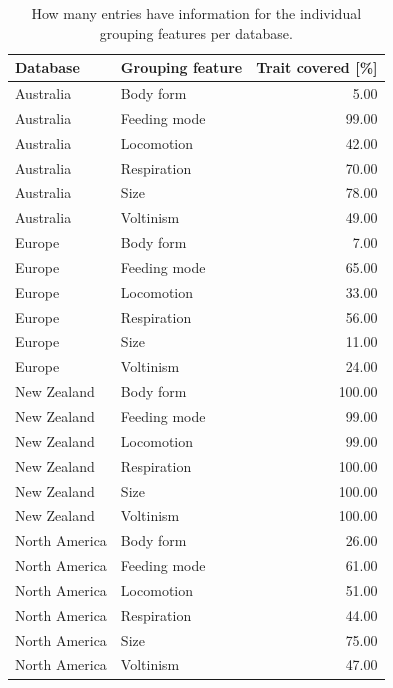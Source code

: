 \documentclass{article}
\begin{document}
\begin{table}[H]
  \centering
  \caption{How many entries have information for the 
  individual grouping features per database.} 
  \label{tab:trait_coverage}
  \begin{tabular}{llr}
    \hline
  Database & Grouping feature & Trait covered [\%] \\ 
    \hline
  Australia & Body form & 5.00 \\ 
    Australia & Feeding mode & 99.00 \\ 
    Australia & Locomotion & 42.00 \\ 
    Australia & Respiration & 70.00 \\ 
    Australia & Size & 78.00 \\ 
    Australia & Voltinism & 49.00 \\ 
    Europe & Body form & 7.00 \\ 
    Europe & Feeding mode & 65.00 \\ 
    Europe & Locomotion & 33.00 \\ 
    Europe & Respiration & 56.00 \\ 
    Europe & Size & 11.00 \\ 
    Europe & Voltinism & 24.00 \\ 
    New Zealand & Body form & 100.00 \\ 
    New Zealand & Feeding mode & 99.00 \\ 
    New Zealand & Locomotion & 99.00 \\ 
    New Zealand & Respiration & 100.00 \\ 
    New Zealand & Size & 100.00 \\ 
    New Zealand & Voltinism & 100.00 \\ 
    North America & Body form & 26.00 \\ 
    North America & Feeding mode & 61.00 \\ 
    North America & Locomotion & 51.00 \\ 
    North America & Respiration & 44.00 \\ 
    North America & Size & 75.00 \\ 
    North America & Voltinism & 47.00 \\ 
    \hline
  \end{tabular}
  \end{table}

\end{document}
